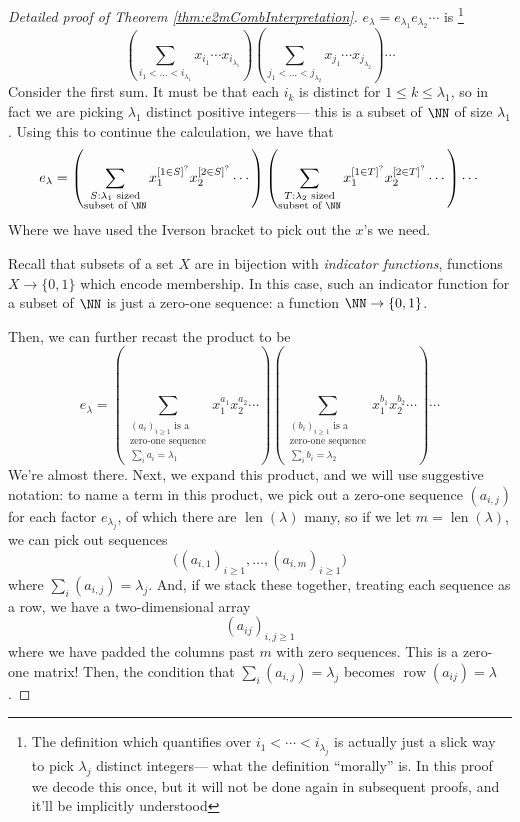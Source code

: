 \documentclass{article}
\DeclareMathOperator{\row}{row}
\DeclareMathOperator{\len}{len}
\begin{document}
\begin{proof}
    [Detailed proof of Theorem \ref{thm:e2mCombInterpretation}]
    $e_\lambda = e_{\lambda_1}e_{\lambda_2}\cdots$ is \footnote{The definition which quantifies over $i_1 < \cdots < i_{\lambda_j}$ is actually just a slick way to pick $\lambda_j$ distinct integers--- what the definition ``morally'' is.
    In this proof we decode this once, but it will not be done again in subsequent proofs, and it'll be implicitly understood}
    \[
        \left(\sum_{i_1<\ldots<i_{\lambda_1}} x_{i_1}\cdots x_{i_{\lambda_1}}\right)
        \left(\sum_{j_1<\ldots<j_{\lambda_2}} x_{j_1}\cdots x_{j_{\lambda_2}}\right)\cdots
    \]
    Consider the first sum.
    It must be that each $i_k$ is distinct for $1 \leq k \leq \lambda_1$, so in fact we are picking $\lambda_1$ distinct positive integers--- this is a subset of $\NN$ of size $\lambda_1$.
    Using this to continue the calculation, we have that
    \[
        e_\lambda 
        =
        \left(\sum_{\substack{S:\lambda_1\text{ sized}\\\text{subset of }\NN}}x_1^{[1\in S]^?}x_2^{[2\in S]^?}\cdots\right)
        \left(\sum_{\substack{T:\lambda_2\text{ sized}\\\text{subset of }\NN}}x_1^{[1\in T]^?}x_2^{[2\in T]^?}\cdots\right)
        \cdots
    \]
    Where we have used the Iverson bracket to pick out the $x$'s we need.

    Recall that subsets of a set $X$ are in bijection with \textit{indicator functions}, functions $X \to \{0,1\}$ which encode membership.
    In this case, such an indicator function for a subset of $\NN$ is just a zero-one sequence: a function $\NN \to \{0,1\}$.

    Then, we can further recast the product to be
    \[
        e_\lambda 
        =
        \left(\sum_{\substack{(a_i)_{i\geq 1}\text{ is a}\\\text{zero-one sequence} \\ \sum_i a_i = \lambda_1}}x_1^{a_1}x_2^{a_2}\cdots\right)
        \left(\sum_{\substack{(b_i)_{i\geq 1}\text{ is a}\\\text{zero-one sequence} \\ \sum_i b_i = \lambda_2}}x_1^{b_1}x_2^{b_2}\cdots\right)
        \cdots
    \]
    We're almost there.
    Next, we expand this product, and we will use suggestive notation: to name a term in this product, we pick out a zero-one sequence $(a_{i,j})$ for each factor $e_{\lambda_j}$, of which there are $\len(\lambda)$ many, so if we let $m=\len(\lambda)$, we can pick out sequences
    \[
        \Big((a_{i,1})_{i\geq1},\ldots,(a_{i,m})_{i\geq1}\Big)
    \]
    where $\sum_i (a_{i,j}) = \lambda_j$.
    And, if we stack these together, treating each sequence as a row, we have a two-dimensional array
    \[
        (a_{ij})_{i,j \geq 1}
    \]
    where we have padded the columns past $m$ with zero sequences.
    This is a zero-one matrix!
    Then, the condition that $\sum_i (a_{i,j}) = \lambda_j$ becomes $\row(a_{ij}) = \lambda$.


\end{proof}
\end{document}
